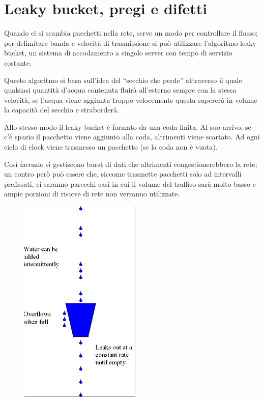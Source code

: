 \section{Leaky bucket, pregi e difetti}

Quando ci si scambia pacchetti nella rete, serve un modo per controllare il flusso; per delimitare banda e velocità di trasmissione si può utilizzare l’algoritmo leaky bucket, un sistema di accodamento a singolo server con tempo di servizio costante.

Questo algoritmo si basa sull’idea del “secchio che perde” attraverso il quale qualsiasi quantità d’acqua contenuta fluirà all’esterno sempre con la stessa velocità, se l’acqua viene aggiunta troppo velocemente questa supererà in volume la capacità del secchio e straborderà.

Allo stesso modo il leaky bucket è formato da una coda finita. Al suo arrivo, se c’è spazio il pacchetto viene aggiunto alla coda, altrimenti viene scartato. Ad ogni ciclo di clock viene trasmesso un pacchetto (se la coda non è vuota).

Così facendo si gestiscono burst di dati che altrimenti congestionerebbero la rete; un contro però può essere che, siccome trasmette pacchetti solo ad intervalli prefissati, ci saranno parecchi casi in cui il volume del traffico sarà molto basso e ampie porzioni di risorse di rete non verranno utilizzate.

\begin{figure}[H]
\centering
\includegraphics[scale=0.7]{res/img/41_LeakyBucket.png}
\end{figure}

